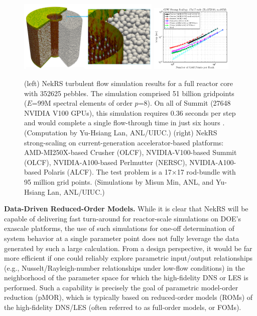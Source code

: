 \begin{figure}[t!] \centering
    \includegraphics[width = 0.60\textwidth]{figs/pbr_pair.png}
    \includegraphics[width = 0.35\textwidth]{figs/nekrs_17x17_crusher_strong.png}
    \caption{(left) NekRS turbulent flow simulation results for a full reactor
core with 352625 pebbles.  The simulation comprised 51 billion gridpoints
($E$=99M spectral elements of order $p$=8).  On all of Summit (27648 NVIDIA
V100 GPUs), this simulation requires 0.36 seconds per step and would complete a
single flow-through time in just six hours \cite{sc22}. (Computation by
Yu-Hsiang Lan, ANL/UIUC.)
(right) NekRS strong-scaling on current-generation accelerator-based platforms:
AMD-MI250X-based Crusher (OLCF),
NVIDIA-V100-based Summit (OLCF),
NVIDIA-A100-based Perlmutter (NERSC),
NVIDIA-A100-based Polaris (ALCF).
The test problem is a 17$\times$17 rod-bundle with 95 million grid points.
(Simulations by Misun Min, ANL, and Yu-Hsiang Lan, ANL/UIUC.)
\label{fig:pbr}}
\end{figure}


\noindent
{\bf Data-Driven Reduced-Order Models.}
While it is clear that NekRS will be capable of delivering fast turn-around
for reactor-scale simulations on DOE's exascale platforms, the use of 
such simulations for one-off determination of system behavior at a single
parameter point does not fully leverage the data generated by such a large
calculation.
From a design perspective, it would be far more efficient if one could reliably
explore parametric input/output relationships (e.g., Nusselt/Rayleigh-number
relationships under low-flow conditions) in the neighborhood of the parameter
space for which the high-fidelity DNS or LES is performed.   Such a capability
is precisely the goal of parametric model-order reduction (pMOR), which is
typically based on reduced-order models (ROMs) of the high-fidelity DNS/LES
(often referred to as full-order models, or FOMs).   


